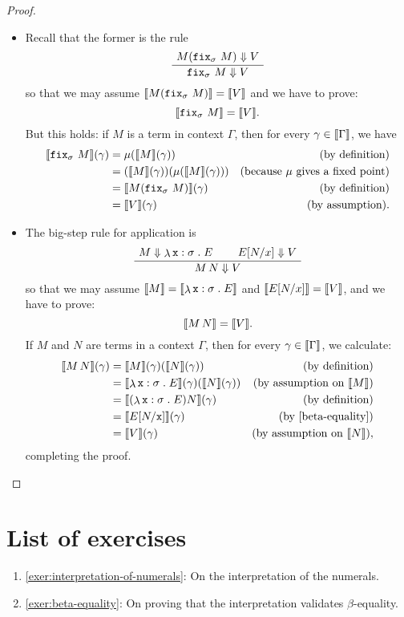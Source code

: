 \begin{proof}
  \begin{itemize}
  \item Recall that the former is the rule
  \[
    \AxiomC{\(M(\pcffix_{\sigma} \, M) \bigstep V\)}
    \UnaryInfC{\({\pcffix_{\sigma} \, M} \bigstep V\)}
    \DisplayProof
  \]
  so that we may assume \(\llbracket M(\operatorname{\mathtt{fix}}_\sigma\,M)\rrbracket = \llbracket V\rrbracket\) and we
  have to prove:
  \[
    \llbracket\operatorname{\mathtt{fix}}_{\sigma} \, M\rrbracket = \llbracket V\rrbracket.
  \]
  But this holds: if \(M\) is a term in context \(\Gamma\), then for
  every \(\gamma \in \llbracket\Gamma\rrbracket\), we have
  \begin{align*}
    \densem{\pcffix_{\sigma} \,M}(\gamma)
    &= \mu\pa*{\densem{M}(\gamma)}
    &\text{(by definition)} \\
    &= \pa*{\densem{M}(\gamma)}\pa*{\mu\pa*{\densem{M}(\gamma)}}
    &\text{(because \(\mu\) gives a fixed point)} \\
    &= \densem{M\pa*{\pcffix_{\sigma}\,M}}(\gamma)
    &\text{(by definition)} \\
    &= \densem{V}(\gamma) &\text{(by assumption)}.
  \end{align*}
  \item   The big-step rule for application is
  \[
    \AxiomC{\(M \bigstep \lambdadot{\var x : \sigma}{E}\)}
    \AxiomC{\(E[N/x] \bigstep V\)}
    \BinaryInfC{\(M \, N \bigstep V\)}
    \DisplayProof
  \]
  so that we may assume
  \(\llbracket M\rrbracket = \llbracket\mathop{\lambda}{\mathtt x : \sigma}\mathrel{.}E\rrbracket\)
  and
  \(\llbracket E[N/x]\rrbracket = \llbracket V\rrbracket\),
  and we have to prove:
  \[
    \llbracket M \, N\rrbracket = \llbracket V\rrbracket.
  \]
  If \(M\) and \(N\) are terms in a context \(\Gamma\), then for every
  \(\gamma \in \llbracket\Gamma\rrbracket\), we calculate:
  \begin{align*}
    \densem{M \, N}(\gamma)
    &= \densem{M}(\gamma)\pa*{\densem{N}(\gamma)}
    &\text{(by definition)} \\
    &= \densem{\lambdadot{\var x : \sigma}{E}}(\gamma)\pa*{\densem{N}(\gamma)}
    &\text{(by assumption on \(\densem{M}\))} \\
    &= \densem*{\pa*{\lambdadot{\var x : \sigma}{E}}N}(\gamma)
    &\text{(by definition)} \\
    &= \densem{E[N/\var x]}(\gamma)
    &\text{(by \cref{beta-equality})} \\
    &= \densem{V}(\gamma)
    &\text{(by assumption on \(\densem{N}\))},
  \end{align*}
  completing the proof. \qedhere
  \end{itemize}
\end{proof}

\section{List of exercises}
\begin{enumerate}
\item \cref{exer:interpretation-of-numerals}: On the interpretation of the numerals.
\item \cref{exer:beta-equality}: On proving that the interpretation validates
  \(\beta\)-equality.
\end{enumerate}

